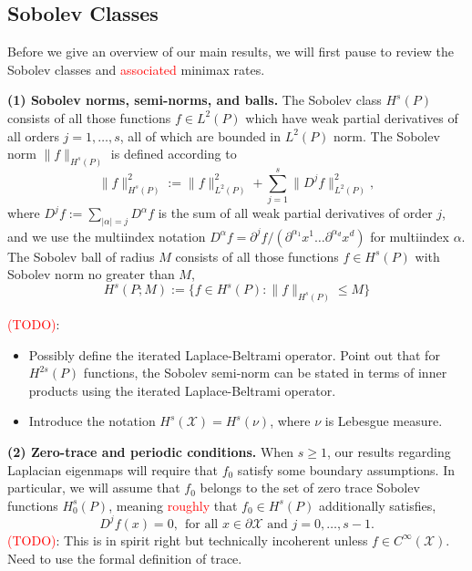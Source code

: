 \documentclass{article}
\newcommand{\1}{\mathbf{1}}
\newcommand{\Leb}{L}
\newcommand{\mc}[1]{\mathcal{#1}}
\theoremstyle{alden}
\theoremstyle{aldenthm}
\theoremstyle{definition}
\theoremstyle{remark}
\begin{document}
\subsection{Sobolev Classes}
\label{sec:sobolev}
Before we give an overview of our main results, we will first pause to review the Sobolev classes and \textcolor{red}{associated} minimax rates.

\textbf{(1) Sobolev norms, semi-norms, and balls.} 
The Sobolev class $H^s(P)$ consists of all those functions $f \in \Leb^2(P)$ which have weak partial derivatives of all orders $j = 1,\ldots,s$, all of which are bounded in $\Leb^2(P)$ norm. The Sobolev norm $\|f\|_{H^s(P)}$ is defined according to
\begin{equation*}
\|f\|_{H^s(P)}^2 := \|f\|_{\Leb^2(P)}^2 + \sum_{j = 1}^{s} \|D^jf\|_{\Leb^2(P)}^2,
\end{equation*}
where $D^jf := \sum_{|\alpha| = j}D^{\alpha}f$ is the sum of all weak partial derivatives of order $j$, and we use the multiindex notation $D^{\alpha}f = \partial^j f/(\partial^{\alpha_1}x^1\ldots \partial^{\alpha_d}x^d)$ for multiindex $\alpha$. The Sobolev ball of radius $M$ consists of all those functions $f \in H^s(P)$ with Sobolev norm no greater than $M$,
\begin{equation*}
H^s(P;M) := \bigl\{f \in H^s(P): \|f\|_{H^s(P)} \leq M\bigr\}
\end{equation*}

\textcolor{red}{(TODO)}: 
\begin{itemize}
	\item Possibly define the iterated Laplace-Beltrami operator. Point out that for $H^{2s}(P)$ functions, the Sobolev semi-norm can be stated in terms of inner products using the iterated Laplace-Beltrami operator.
	\item Introduce the notation $H^s(\mc{X}) = H^s(\nu)$, where $\nu$ is Lebesgue measure.
\end{itemize}

\textbf{(2) Zero-trace and periodic conditions.}
When $s \geq 1$, our results regarding Laplacian eigenmaps will require that $f_0$ satisfy some boundary assumptions. In particular, we will assume that $f_0$ belongs to the set of zero trace Sobolev functions $H_0^{s}(P)$, meaning \textcolor{red}{roughly} that $f_0 \in H^s(P)$ additionally satisfies,
\begin{equation}
\label{eqn:zero_trace}
D^jf(x) = 0,~~\textrm{for all $x \in \partial \mc{X}$ and $j = 0,\ldots,s - 1$.}
\end{equation}
\textcolor{red}{(TODO)}: This is in spirit right but technically incoherent unless $f \in C^{\infty}(\mc{X})$. Need to use the formal definition of trace.
\end{document}
